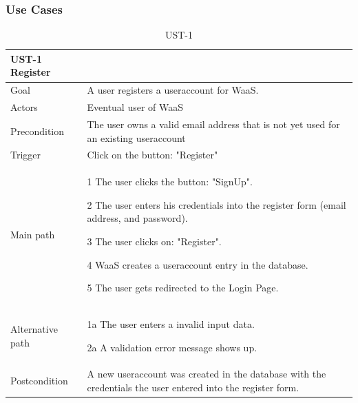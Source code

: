 \documentclass[titlepage, 12pt]{article}
\newenvironment{packed_itemize}{
  \vspace{-\topsep}
  \begin{itemize}
    \setlength{\itemsep}{1pt}
    \setlength{\parskip}{0pt}
    \setlength{\parsep}{0pt}
  }{\end{itemize}}
\begin{document}
\subsubsection{{Use Cases}}

\begin{table}[H]
  \begin{center}

    \begin{tabular}{p{4cm}|p{10cm}}
      \textbf{UST-1 Register}                                                                                                        \\
      \hline
      Goal             & A user registers a useraccount for WaaS.                                                                    \\
      \hline
      Actors           & Eventual user of WaaS                                                                                       \\
      \hline
      Precondition     & The user owns a valid email address that is not yet used for an existing useraccount                        \\
      \hline
      Trigger          & Click on the button: "Register"                                                                             \\
      \hline
      Main path        &
      \begin{packed_itemize}
        \item [1] The user clicks the button: "SignUp".
        \item [2] The user enters his credentials into the register form (email address, and password).
        \item [3] The user clicks on: "Register".
        \item [4] WaaS creates a useraccount entry in the database.
        \item [5] The user gets redirected to the Login Page.
      \end{packed_itemize}                                                                                                      \\
      \hline
      Alternative path &
      \begin{packed_itemize}
        \item [1a] The user enters a invalid input data.
        \item [2a] A validation error message shows up.
      \end{packed_itemize}                                                                                                      \\
      \hline
      Postcondition    & A new useraccount was created in the database with the credentials the user entered into the register form. \\
    \end{tabular}

    \caption{UST-1}
    \label{table:UST-1}

  \end{center}
\end{table}
\end{document}
